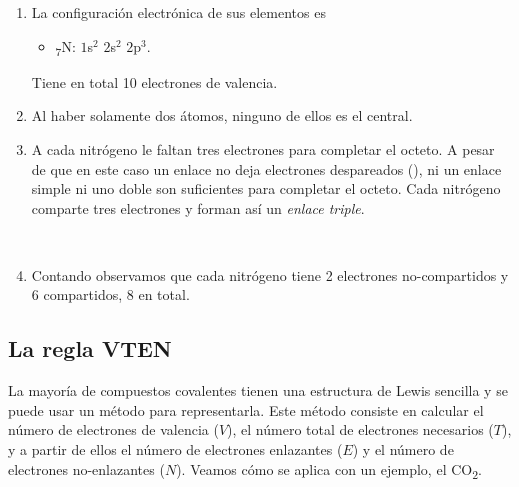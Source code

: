 \documentclass[twoside,a4paper,justified,12pt]{tufte-handout}
\renewcommand{\sb}[1]{\textsubscript{#1}}
\begin{document}
\begin{enumerate}[1)]
    \item La configuración electrónica de sus elementos es
    \begin{itemize}
        \item \sb{7}N: $1$s$^2$ $2$s$^2$ $2$p$^3$.
    \end{itemize}
    
    Tiene en total 10 electrones de valencia.
    
    \item Al haber solamente dos átomos, ninguno de ellos es el central.
    
    \item A cada nitrógeno le faltan tres electrones para completar el octeto. A pesar de que en este caso un enlace no deja electrones despareados (\hspace{1ex}\hspace{1ex}), ni un enlace simple ni uno doble son suficientes para completar el octeto. Cada nitrógeno comparte tres electrones y forman así un \textit{enlace triple}.
        
     {\centering{}\\}
     
     \item Contando observamos que cada nitrógeno tiene 2 electrones no-compartidos y 6 compartidos, 8 en total.
\end{enumerate}

\subsection{La regla VTEN}

La mayoría de compuestos covalentes tienen una estructura de Lewis sencilla y se puede usar un método para representarla. Este método consiste en calcular el número de electrones de valencia ($V$), el número total de electrones necesarios ($T$), y a partir de ellos el número de electrones enlazantes ($E$) y el número de electrones no-enlazantes ($N$). Veamos cómo se aplica con un ejemplo, el CO\sb{2}.
\end{document}
